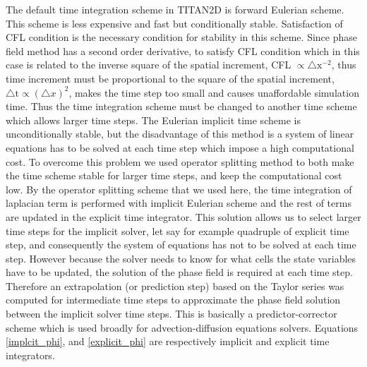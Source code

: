 \documentclass[letterpaper,10pt]{article}
\begin{document}
The default time integration scheme in TITAN2D is forward Eulerian scheme. This scheme is less expensive and fast but conditionally 
stable. Satisfaction of CFL condition is the necessary condition for stability in this scheme. Since phase field 
method has a second order derivative, to satisfy CFL condition which in this case is related to the inverse square of the spatial increment, CFL $\propto \bigtriangleup \text{x}^{-2}$, thus time increment must be proportional to the square 
of the spatial increment, $\bigtriangleup \text{t} \propto ( \bigtriangleup x)^2 $, makes the time step too small and causes unaffordable simulation time.
Thus the time integration scheme must be changed to another time scheme which allows larger time steps.
The Eulerian implicit time scheme is unconditionally stable, but the disadvantage of this method is a system of linear equations has to be solved at each time step which impose a high computational cost.
To overcome this problem we used operator splitting method to both make the time scheme stable for larger time steps, and keep the computational cost low.  
By the operator splitting scheme that we used here, the time integration of laplacian term is performed with implicit Eulerian scheme and the rest of terms are updated in the explicit time integrator. This solution allows us to select larger time steps for the implicit solver, let say for example quadruple of explicit time step, and consequently the system of equations has not to be solved at each time step. However because the solver needs to know for what cells the state variables have to be updated, the solution of the phase field is required at each time step. Therefore an extrapolation (or prediction step) based on the Taylor series was computed for intermediate time steps to approximate the phase field solution between the implicit solver time steps.
This is basically a predictor-corrector scheme which is used broadly for advection-diffusion equations solvers. Equations \eqref{implcit_phi}, and  \eqref{explicit_phi} are respectively implicit and explicit time integrators.\\
\end{document}
